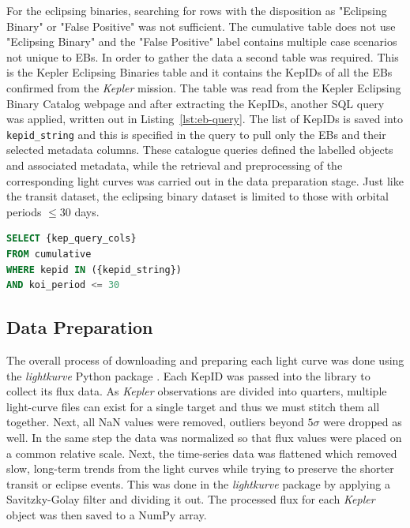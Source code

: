 For the eclipsing binaries, searching for rows with the disposition as "Eclipsing Binary" or "False Positive" was not sufficient. The cumulative table does not use "Eclipsing Binary" and the "False Positive" label contains multiple case scenarios not unique to EBs. In order to gather the data a second table was required. This is the Kepler Eclipsing Binaries table and it contains the KepIDs of all the EBs confirmed from the \textit{Kepler} mission. The table was read from the Kepler Eclipsing Binary Catalog webpage and after extracting the KepIDs, another SQL query was applied, written out in Listing~\ref{lst:eb-query}. The list of KepIDs is saved into \texttt{kepid\_string} and this is specified in the query to pull only the EBs and their selected metadata columns. These catalogue queries defined the labelled objects and associated metadata, while the retrieval and preprocessing of the corresponding light curves was carried out in the data preparation stage. Just like the transit dataset, the eclipsing binary dataset is limited to those with orbital periods $\leq 30$ days.

\begin{lstlisting}[language=SQL, caption={SQL query used to extract eclipsing binary information from Kepler Exoplanet Archive.}, label={lst:eb-query}]
SELECT {kep_query_cols}
FROM cumulative
WHERE kepid IN ({kepid_string})
AND koi_period <= 30
\end{lstlisting}

\subsection{Data Preparation}

The overall process of downloading and preparing each light curve was done using the \textit{lightkurve} Python package \citep{Lightkurve}. Each KepID was passed into the library to collect its flux data. As \textit{Kepler} observations are divided into quarters, multiple light-curve files can exist for a single target and thus we must stitch them all together. Next, all NaN values were removed, outliers beyond $5\sigma$ were dropped as well. In the same step the data was normalized so that flux values were placed on a common relative scale. Next, the time-series data was flattened which removed slow, long-term trends from the light curves while trying to preserve the shorter transit or eclipse events. This was done in the \textit{lightkurve} package by applying a Savitzky-Golay filter and dividing it out. The processed flux for each \textit{Kepler} object was then saved to a NumPy array.

